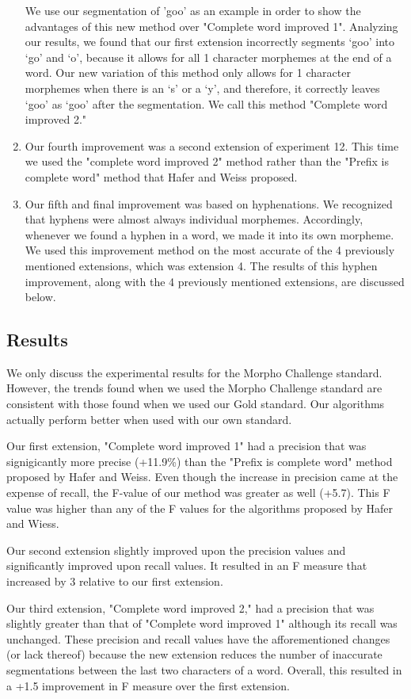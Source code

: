 \documentclass[11pt,letterpaper]{article}
\begin{document}
\begin{enumerate}
We use our segmentation of 'goo' as an example in order to show the advantages of this new method over "Complete word improved 1". Analyzing our results, we found that our first extension incorrectly segments `goo' into `go' and `o', because it allows for all 1 character morphemes at the end of a word. Our new variation of this method only allows for 1 character morphemes when there is an `s' or a `y', and therefore, it correctly leaves `goo' as `goo' after the segmentation. We call this method "Complete word improved 2."

\item Our fourth improvement was a second extension of experiment 12. This time we used the "complete word improved 2" method rather than the "Prefix is complete word" method that Hafer and Weiss proposed.

\item Our fifth and final improvement was based on hyphenations. We recognized that hyphens were almost always individual morphemes. Accordingly, whenever we found a hyphen in a word, we made it into its own morpheme. We used this improvement method on the most accurate of the 4 previously mentioned extensions, which was extension 4. The results of this hyphen improvement, along with the 4 previously mentioned extensions, are discussed below.
\end{enumerate}
\subsection{Results}
We only discuss the experimental results for the Morpho Challenge standard. However, the trends found when we used the Morpho Challenge standard are consistent with those found when we used our Gold standard. Our algorithms actually perform better when used with our own standard.

Our first extension, "Complete word improved 1" had a precision that was signigicantly more precise (+11.9\%) than the "Prefix is complete word" method proposed by Hafer and Weiss. Even though the increase in precision came at the expense of recall, the F-value of our method was greater as well (+5.7). This F value was higher than any of the F values for the algorithms proposed by Hafer and Wiess.

Our second extension slightly improved upon the precision values and significantly improved upon recall values. It resulted in an F measure that increased by 3 relative to our first extension.

Our third extension, "Complete word improved 2," had a precision that was slightly greater than that of "Complete word improved 1" although its recall was unchanged. These precision and recall values have the afforementioned changes (or lack thereof) because the new extension reduces the number of inaccurate segmentations between the last two characters of a word. Overall, this resulted in a +1.5 improvement in F measure over the first extension.
\end{document}
